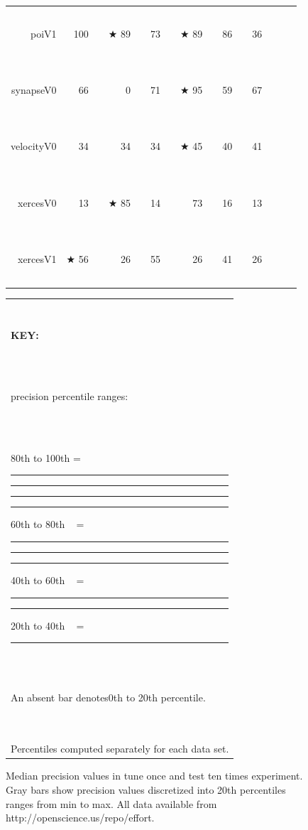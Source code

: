 \documentclass{sig-alternative}
\newcommand{\crule}[3][darkgray]{\textcolor{#1}{\rule{#2}{#3}}}
\newcommand{\rone}{\crule{1mm}{1.95mm}}
\newcommand{\rtwo}{\crule{1mm}{1.95mm}\hspace{0.3pt}\crule{1mm}{1.95mm}}
\newcommand{\rthree}{\crule{1mm}{1.95mm}\hspace{0.3pt}\crule{1mm}{1.95mm}\hspace{0.3pt}\crule{1mm}{1.95mm}}
\newcommand{\rfour}{\crule{1mm}{1.95mm}\hspace{0.3pt}\crule{1mm}{1.95mm}\hspace{0.3pt}\crule{1mm}{1.95mm}\hspace{0.3pt}\crule{1mm}{1.95mm}}
\begin{document}
\begin{figure}
\begin{minipage}{0.81\linewidth}
\begin{tabular}{r@{~}|r@{~}l@{~}|r@{~}l@{~}|r@{~}l|r@{~}@{~}l|r@{~}l@{~}|r@{~}l@{~}|r@{~}l}
poiV1 & 100 & {\rfour} &$\bigstar$ 89 & {\rfour} & 73 & {\rtwo} &$\bigstar$ 89 & {\rfour} & 86 & {\rthree} & 36 &        \\
synapseV0 & 66 & {\rthree} & 0 &         & 71 & {\rthree} &$\bigstar$ 95 & {\rfour} & 59 & {\rthree} & 67 & {\rthree}\\
velocityV0 & 34 &         & 34 &         & 34 &         &$\bigstar$ 45 & {\rfour} & 40 & {\rtwo} & 41 & {\rthree}\\
xercesV0 & 13 &         &$\bigstar$ 85 & {\rfour} & 14 &         & 73 & {\rfour} & 16 &         & 13 &        \\
xercesV1 &$\bigstar$ 56 & {\rfour} & 26 &         & 55 & {\rfour} & 26 &         & 41 & {\rtwo} & 26 &        \\
\end{tabular}
\end{minipage}\begin{minipage}{.15\linewidth}
\begin{tabular}{|p{\linewidth}|}\hline

~\\

{\bf KEY:}

~\\

precision percentile ranges:

~\\

80th to 100th = {\rfour}

60th to 80th ~ = {\rthree}

40th to 60th  ~ = {\rtwo}

20th to 40th  ~ = {\rone}

~\\

An absent bar denotes\newline 0th to 20th percentile.

~\\

Percentiles computed  separately
for each data set.\\\hline
\end{tabular}
\end{minipage}
\caption{Median precision values in tune once and test ten times experiment. 
Gray bars  show  precision values
discretized into 20th percentiles ranges from min to max.
All data available from http://openscience.us/repo/effort.
}\label{fig:nonc}
\end{figure}

\end{document}
